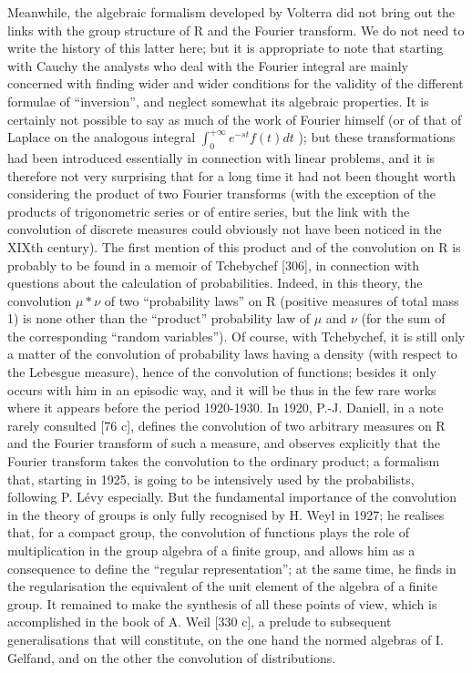 Meanwhile, the algebraic formalism developed by Volterra did not bring out the links with the group structure of R and the Fourier transform. We do not need to write the history of this latter here; but it is appropriate to note that starting with Cauchy the analysts who deal with the Fourier integral are mainly concerned with finding wider and wider conditions for the validity of the different formulae of ``inversion'', and neglect somewhat its algebraic properties. It is certainly not possible to say as much of the work of Fourier himself (or of that of Laplace on the analogous integral \(\int_{0}^{+\infty} e^{-st} f(t) dt\) ); but these transformations had been introduced essentially in connection with linear problems, and it is therefore not very surprising that for a long time it had not been thought worth considering the product of two Fourier transforms (with the exception of the products of trigonometric series or of entire series, but the link with the convolution of discrete measures could obviously not have been noticed in the XIXth century). The first mention of this product and of the convolution on R is probably to be found in a memoir of Tchebychef {[}306{]}, in connection with questions about the calculation of probabilities. Indeed, in this theory, the convolution \(\mu * \nu\) of two ``probability laws'' on R (positive measures of total mass 1) is none other than the ``product'' probability law of \(\mu\) and \(\nu\) (for the sum of the corresponding ``random variables''). Of course, with Tchebychef, it is still only a matter of the convolution of probability laws having a density (with respect to the Lebesgue measure), hence of the convolution of functions; besides it only occurs with him in an episodic way, and it will be thus in the few rare works where it appears before the period 1920-1930. In 1920, P.-J. Daniell, in a note rarely consulted {[}76 c{]}, defines the convolution of two arbitrary measures on R and the Fourier transform of such a measure, and observes explicitly that the Fourier transform takes the convolution to the ordinary product; a formalism that, starting in 1925, is going to be intensively used by the probabilists, following P. Lévy especially. But the fundamental importance of the convolution in the theory of groups is only fully recognised by H. Weyl in 1927; he realises that, for a compact group, the convolution of functions plays the role of multiplication in the group algebra of a finite group, and allows him as a consequence to define the ``regular representation''; at the same time, he finds in the regularisation the equivalent of the unit element of the algebra of a finite group. It remained to make the synthesis of all these points of view, which is accomplished in the book of A. Weil {[}330 c{]}, a prelude to subsequent generalisations that will constitute, on the one hand the normed algebras of I. Gelfand, and on the other the convolution of distributions.

